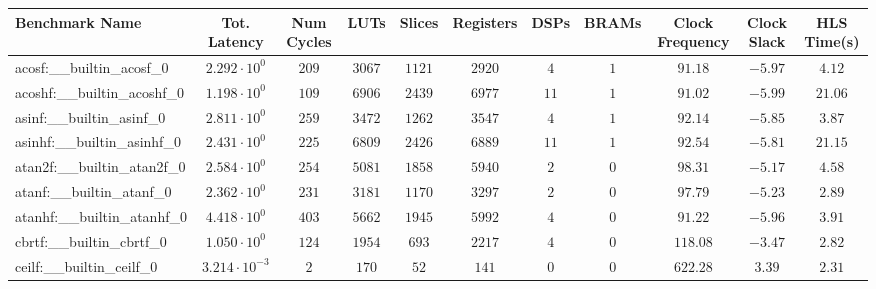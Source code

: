\begin{tabular}{|l|c|c|c|c|c|c|c|c|c|c|}
\hline
Benchmark Name                            & Tot. Latency            & Num Cycles & LUTs       & Slices    & Registers  & DSPs    & BRAMs & Clock Frequency & Clock Slack & HLS Time(s) \\
\hline
acosf:\_\_builtin\_acosf\_0               & $ 2.292 \cdot 10^{0}  $ & $ 209    $ & $ 3067   $ & $ 1121  $ & $ 2920   $ & $ 4   $ & $ 1 $ & $ 91.18       $ & $ -5.97   $ & $ 4.12    $ \\
acoshf:\_\_builtin\_acoshf\_0             & $ 1.198 \cdot 10^{0}  $ & $ 109    $ & $ 6906   $ & $ 2439  $ & $ 6977   $ & $ 11  $ & $ 1 $ & $ 91.02       $ & $ -5.99   $ & $ 21.06   $ \\
asinf:\_\_builtin\_asinf\_0               & $ 2.811 \cdot 10^{0}  $ & $ 259    $ & $ 3472   $ & $ 1262  $ & $ 3547   $ & $ 4   $ & $ 1 $ & $ 92.14       $ & $ -5.85   $ & $ 3.87    $ \\
asinhf:\_\_builtin\_asinhf\_0             & $ 2.431 \cdot 10^{0}  $ & $ 225    $ & $ 6809   $ & $ 2426  $ & $ 6889   $ & $ 11  $ & $ 1 $ & $ 92.54       $ & $ -5.81   $ & $ 21.15   $ \\
atan2f:\_\_builtin\_atan2f\_0             & $ 2.584 \cdot 10^{0}  $ & $ 254    $ & $ 5081   $ & $ 1858  $ & $ 5940   $ & $ 2   $ & $ 0 $ & $ 98.31       $ & $ -5.17   $ & $ 4.58    $ \\
atanf:\_\_builtin\_atanf\_0               & $ 2.362 \cdot 10^{0}  $ & $ 231    $ & $ 3181   $ & $ 1170  $ & $ 3297   $ & $ 2   $ & $ 0 $ & $ 97.79       $ & $ -5.23   $ & $ 2.89    $ \\
atanhf:\_\_builtin\_atanhf\_0             & $ 4.418 \cdot 10^{0}  $ & $ 403    $ & $ 5662   $ & $ 1945  $ & $ 5992   $ & $ 4   $ & $ 0 $ & $ 91.22       $ & $ -5.96   $ & $ 3.91    $ \\
cbrtf:\_\_builtin\_cbrtf\_0               & $ 1.050 \cdot 10^{0}  $ & $ 124    $ & $ 1954   $ & $ 693   $ & $ 2217   $ & $ 4   $ & $ 0 $ & $ 118.08      $ & $ -3.47   $ & $ 2.82    $ \\
ceilf:\_\_builtin\_ceilf\_0               & $ 3.214 \cdot 10^{-3} $ & $ 2      $ & $ 170    $ & $ 52    $ & $ 141    $ & $ 0   $ & $ 0 $ & $ 622.28      $ & $ 3.39    $ & $ 2.31    $ \\

\end{tabular}
